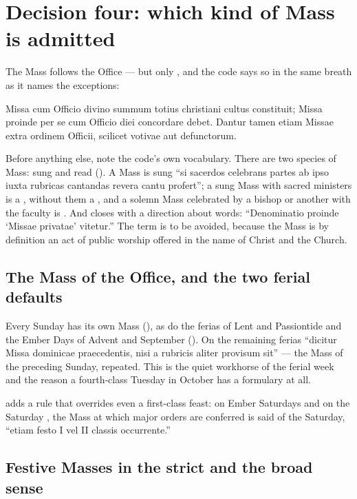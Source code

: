 \section{Decision four: which kind of Mass is admitted}

The Mass follows the Office --- but only , and the code says so
in the same breath as it names the exceptions:

\begin{rulebox}{}
Missa cum Officio divino summum totius christiani cultus constituit; Missa
proinde per se cum Officio diei concordare debet. Dantur tamen etiam Missae
extra ordinem Officii, scilicet votivae aut defunctorum.
\end{rulebox}

Before anything else, note the code's own vocabulary. There are two species of
Mass: sung and read (). A Mass is sung ``si sacerdos celebrans partes
ab ipso iuxta rubricas cantandas revera cantu profert''; a sung Mass with
sacred ministers is a , without them a , and a solemn Mass celebrated by a bishop or another with the faculty
is . And  closes with a direction about words:
``Denominatio proinde `Missae privatae' vitetur.'' The term  is to be avoided, because the Mass is by definition an act of public
worship offered in the name of Christ and the Church.

\subsection{The Mass of the Office, and the two ferial defaults}

Every Sunday has its own Mass (), as do the ferias of Lent and
Passiontide and the Ember Days of Advent and September (). On the
remaining ferias ``dicitur Missa dominicae praecedentis, nisi a rubricis aliter
provisum sit'' --- the Mass of the preceding Sunday, repeated. This is the
quiet workhorse of the ferial week and the reason a fourth-class Tuesday in
October has a formulary at all.

 adds a rule that overrides even a first-class feast: on Ember
Saturdays and on the Saturday , the Mass at which major
orders are conferred is said of the Saturday, ``etiam festo I vel II classis
occurrente.''

\subsection{Festive Masses in the strict and the broad sense}

